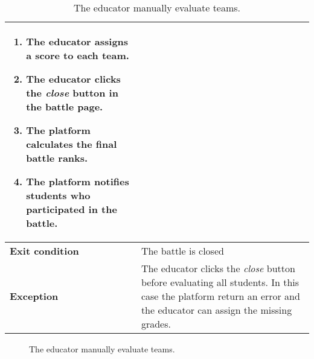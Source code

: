 \begin{enumerate}[label=\textbf{UC\arabic*}:,leftmargin=1.3cm]
\begin{table}[H]
\begin{tabular}{|l|p{11.9cm}|}
\begin{enumerate}[label=\arabic*.]
                              \item The educator assigns a score to each team.
                              \item The educator clicks the \emph{close} button in the battle page.
                              \item The platform calculates the final battle ranks.
                              \item The platform notifies students who participated in the battle.
                        \end{enumerate}                 \\\hline
                        \textbf{Exit condition}  & The battle is closed                                                        \\\hline
                        \textbf{Exception}       & The educator clicks the \emph{close} button before evaluating all students.
                        In this case the platform return an error and the educator can assign the missing grades.              \\\hline
                  \end{tabular}
                  \caption{The educator manually evaluate teams.}
                  \label{table:The educator manually evaluate teams}
            \end{table}

            \begin{figure}[H]
                  \centering
                  \caption{The educator manually evaluate teams.}
                  \label{fig:The educator manually evaluate teams}
            \end{figure}

            \pagebreak


\end{enumerate}
